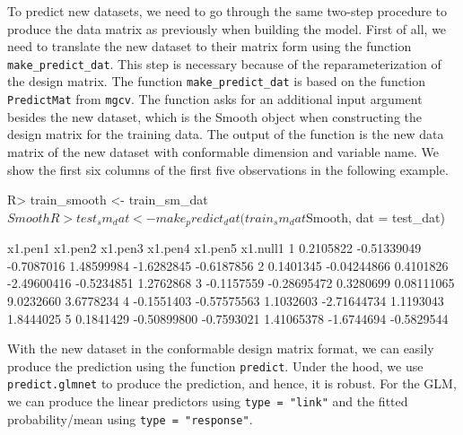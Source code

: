 \documentclass[
]{jss}
\begin{document}
To predict new datasets, we need to go through the same two-step
procedure to produce the data matrix as previously when building the
model. First of all, we need to translate the new dataset to their
matrix form using the function \texttt{make\_predict\_dat}. This step is
necessary because of the reparameterization of the design matrix. The
function \texttt{make\_predict\_dat} is based on the function
\texttt{PredictMat} from \texttt{mgcv}. The function asks for an
additional input argument besides the new dataset, which is the Smooth
object when constructing the design matrix for the training data. The
output of the function is the new data matrix of the new dataset with
conformable dimension and variable name. We show the first six columns
of the first five observations in the following example.

\begin{CodeChunk}
\begin{CodeInput}
R> train_smooth <- train_sm_dat$Smooth
R> test_sm_dat <- make_predict_dat(train_sm_dat$Smooth, dat = test_dat)
\end{CodeInput}
\end{CodeChunk}

\begin{CodeChunk}
\begin{CodeOutput}
     x1.pen1     x1.pen2    x1.pen3     x1.pen4    x1.pen5   x1.null1
1  0.2105822 -0.51339049 -0.7087016  1.48599984 -1.6282845 -0.6187856
2  0.1401345 -0.04244866  0.4101826 -2.49600416 -0.5234851  1.2762868
3 -0.1157559 -0.28695472  0.3280699  0.08111065  9.0232660  3.6778234
4 -0.1551403 -0.57575563  1.1032603 -2.71644734  1.1193043  1.8444025
5  0.1841429 -0.50899800 -0.7593021  1.41065378 -1.6744694 -0.5829544
\end{CodeOutput}
\end{CodeChunk}

With the new dataset in the conformable design matrix format, we can
easily produce the prediction using the function \texttt{predict}. Under
the hood, we use \texttt{predict.glmnet} to produce the prediction, and
hence, it is robust. For the GLM, we can produce the linear predictors
using \texttt{type\ =\ "link"} and the fitted probability/mean using
\texttt{type\ =\ "response"}.

\begin{CodeChunk}
\end{CodeChunk}
\end{document}
